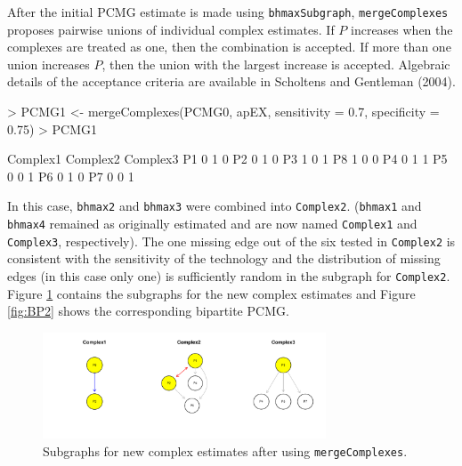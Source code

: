 \documentclass[11pt]{article}
\newcommand{\Rfunction}[1]{{\texttt{#1}}}
\newcommand{\Robject}[1]{{\texttt{#1}}}
\begin{document}
After the initial PCMG estimate is made using \Rfunction{bhmaxSubgraph},
\Rfunction{mergeComplexes} proposes pairwise unions of individual complex estimates.  If $P$ increases when the complexes are treated
as one, then the combination is accepted.  If more than one union increases
$P$, then the union with the largest increase is accepted.  Algebraic details
of the acceptance criteria are available in Scholtens and Gentleman (2004).

\begin{Schunk}
\begin{Sinput}
> PCMG1 <- mergeComplexes(PCMG0, apEX, sensitivity = 0.7, specificity = 0.75)
> PCMG1
\end{Sinput}
\begin{Soutput}
   Complex1 Complex2 Complex3
P1        0        1        0
P2        0        1        0
P3        1        0        1
P8        1        0        0
P4        0        1        1
P5        0        0        1
P6        0        1        0
P7        0        0        1
\end{Soutput}
\end{Schunk}

In this case, \Robject{bhmax2} and \Robject{bhmax3} were combined
into \Robject{Complex2}. (\Robject{bhmax1} and \Robject{bhmax4} remained as
originally estimated and are now named
\Robject{Complex1} and \Robject{Complex3}, respectively).  The one
missing edge out of the six tested in \Robject{Complex2} is consistent with the sensitivity of the
technology and the distribution of missing edges (in this case only one) is sufficiently random in the
subgraph for \Robject{Complex2}.  Figure \ref{fig:mergedComplex} contains the subgraphs for the
new complex estimates and Figure \ref{fig:BP2} shows the corresponding bipartite PCMG.


\begin{figure}[htbp]
\begin{center}
\includegraphics[width=0.75\textwidth]{apComplex-mergedComplex}
\caption{\label{fig:mergedComplex} Subgraphs for new complex estimates after
using \Rfunction{mergeComplexes}.}
\end{center}
\end{figure}
\end{document}
